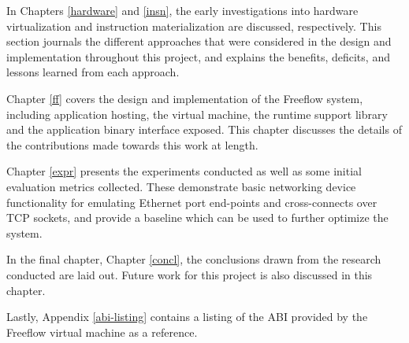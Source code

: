 In Chapters \ref{hardware} and \ref{insn}, the early investigations into
hardware virtualization and instruction materialization are discussed,
respectively. This section journals the different approaches that were
considered in the design and implementation throughout this project, and
explains the benefits, deficits, and lessons learned from each approach.

Chapter \ref{ff} covers the design and implementation of the Freeflow system,
including application hosting, the virtual machine, the runtime support
library and the application binary interface exposed. This chapter discusses
the details of the contributions made towards this work at length.

Chapter \ref{expr} presents the experiments conducted as well as some initial
evaluation metrics collected. These demonstrate basic networking device
functionality for emulating Ethernet port end-points and cross-connects over
TCP sockets, and provide a baseline which can be used to further optimize the
system.

In the final chapter, Chapter \ref{concl}, the conclusions drawn from the
research conducted are laid out. Future work for this project is also discussed
in this chapter.

Lastly, Appendix \ref{abi-listing} contains a listing of the ABI provided by
the Freeflow virtual machine as a reference.
